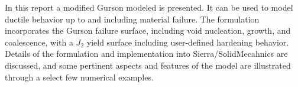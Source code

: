 In this report a modified Gurson modeled is presented. It can be used
to model ductile behavior up to and including material failure. The
formulation incorporates the Gurson failure surface, including void
nucleation, growth, and coalescence, with a $J_2$ yield surface
including user-defined hardening behavior. Details of the formulation
and implementation into Sierra/SolidMecahnics are discussed, and some
pertinent aspects and features of the model are illustrated through a
select few numerical examples.


